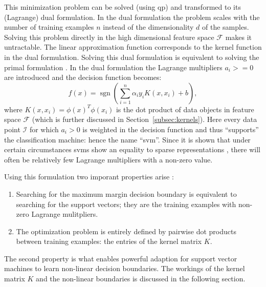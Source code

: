 
This minimization problem can be solved (using \gls{qp}) and transformed to its (Lagrange) dual formulation.
In the dual formulation the problem scales with the number of training examples $n$ instead of the dimensionality $d$ of the samples.
Solving this problem directly in the high dimensional feature space $\mathcal{F}$ makes it untractable.
The linear approximation function corresponds to the kernel function in the dual formulation.
Solving this dual formulation is equivalent to solving the primal formulation \cite{cherkassky2007learning}.
In the dual formulation the Lagrange multipliers $a_i >= 0$ are introduced and the decision function becomes:
\begin{equation}\label{eq:svm_lagrange}
  f(x) = \operatorname{sgn}( \sum_{i=1}^n \alpha_i y_i K(x, x_i) + b),
\end{equation}
where $K(x, x_i) = \phi(x)^T\phi(x_i)$ is the dot product of data objects in feature space $\mathcal{F}$ (which is further discussed in Section~\ref{subsec:kernels}).
Here every data point $\mathcal{I}$ for which $a_i > 0$ is weighted in the decision function and thus ``supports'' the classification machine: hence the name ``\acrlong{svm}''.
Since it is shown that under certain circumstances \glspl{svm} show an equality to sparse representations \cite{girosi1998equivalence,smola1998connection}, there will often be relatively few Lagrange multipliers with a non-zero value.

Using this formulation two imporant properties arise \cite{flach2012machine}:
\begin{enumerate}
  \item Searching for the maximum margin decision boundary is equivalent to searching for the support vectors; they are the training examples with non-zero Lagrange mulitpliers.
  \item The optimization problem is entirely defined by pairwise dot products between training examples: the entries of the kernel matrix $K$.
\end{enumerate}
The second property is what enables powerful adaption for support vector machines to learn non-linear decision boundaries.
The workings of the kernel matrix $K$ and the non-linear boundaries is discussed in the following section.


